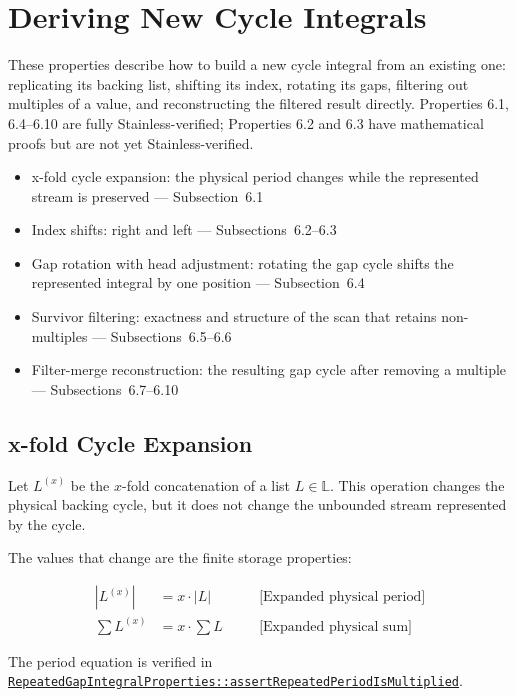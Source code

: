 \section{Deriving New Cycle Integrals}

These properties describe how to build a new cycle integral from an
existing one: replicating its backing list, shifting its index, rotating
its gaps, filtering out multiples of a value, and reconstructing the
filtered result directly. Properties 6.1, 6.4--6.10 are fully
Stainless-verified; Properties 6.2 and 6.3 have mathematical proofs but are
not yet Stainless-verified.

\begin{itemize}
  \item x-fold cycle expansion: the physical period changes while the
    represented stream is preserved --- Subsection~6.1
  \item Index shifts: right and left --- Subsections~6.2--6.3
  \item Gap rotation with head adjustment: rotating the gap cycle shifts
    the represented integral by one position --- Subsection~6.4
  \item Survivor filtering: exactness and structure of the scan that
    retains non-multiples --- Subsections~6.5--6.6
  \item Filter-merge reconstruction: the resulting gap cycle after removing
    a multiple --- Subsections~6.7--6.10
\end{itemize}

\subsection{x-fold Cycle Expansion}

Let $L^{(x)}$ be the $x$-fold concatenation of a list $L \in \mathbb{L}$.
This operation changes the physical backing cycle, but it does not change
the unbounded stream represented by the cycle.

The values that change are the finite storage properties:

\begin{equation*}
\begin{aligned}
|L^{(x)}| &= x \cdot |L|
  \quad &&\text{[Expanded physical period]} \\
\sum L^{(x)} &= x \cdot \sum L
  \quad &&\text{[Expanded physical sum]}
\end{aligned}
\end{equation*}

{\raggedright
The period equation is verified in
\href{https://github.com/thiagomata/prime-numbers/blob/integral-cycle-article-v1.0.0/src/main/scala/v1/chapter4/cycle/integral/recursive/properties/RepeatedGapIntegralProperties.scala}{\texttt{RepeatedGapIntegralProperties::\allowbreak assertRepeatedPeriodIsMultiplied}}.
\par}

